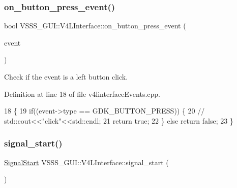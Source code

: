 \subsubsection{\texorpdfstring{on\+\_\+button\+\_\+press\+\_\+event()}{on\_button\_press\_event()}}
{\footnotesize\ttfamily bool V\+S\+S\+S\+\_\+\+G\+U\+I\+::\+V4\+L\+Interface\+::on\+\_\+button\+\_\+press\+\_\+event (\begin{DoxyParamCaption}\item[{Gdk\+Event\+Button $\ast$}]{event }\end{DoxyParamCaption})\hspace{0.3cm}{\ttfamily [protected]}}



Check if the event is a left button click. 



Definition at line 18 of file v4linterface\+Events.\+cpp.


\begin{DoxyCode}
18                                                                   \{
19         \textcolor{keywordflow}{if}((event->type == GDK\_BUTTON\_PRESS)) \{
20             \textcolor{comment}{//  std::cout<<"click"<<std::endl;}
21             \textcolor{keywordflow}{return} \textcolor{keyword}{true};
22         \} \textcolor{keywordflow}{else} \textcolor{keywordflow}{return} \textcolor{keyword}{false};
23     \}
\end{DoxyCode}
\mbox{\label{class_v_s_s_s___g_u_i_1_1_v4_l_interface_a43220e7911fcf933c7e2e702b703943e}} 
\subsubsection{\texorpdfstring{signal\+\_\+start()}{signal\_start()}}
{\footnotesize\ttfamily \hyperlink{class_v_s_s_s___g_u_i_1_1_v4_l_interface_aaa97121c9564dbb8c0717725a795ed15}{Signal\+Start} V\+S\+S\+S\+\_\+\+G\+U\+I\+::\+V4\+L\+Interface\+::signal\+\_\+start (\begin{DoxyParamCaption}{ }\end{DoxyParamCaption})\hspace{0.3cm}{\ttfamily [inline]}}




